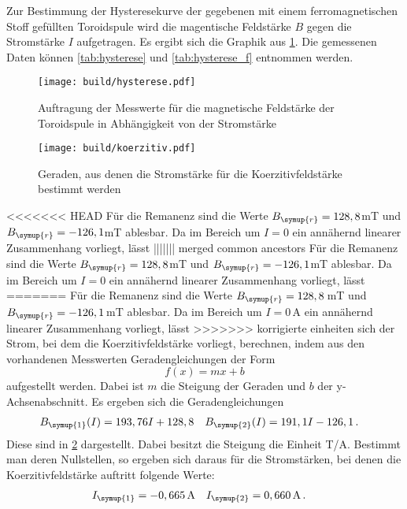 Zur Bestimmung der Hysteresekurve der gegebenen mit einem ferromagnetischen Stoff
gefüllten Toroidspule wird die magentische Feldstärke $B$ gegen die Stromstärke
$I$ aufgetragen. Es ergibt sich die Graphik aus \ref{fig:hysterese}. Die gemessenen
Daten können \ref{tab:hysterese} und \ref{tab:hysterese_f}  entnommen werden.

\begin{figure}
  \centering
  \texttt{[image: build/hysterese.pdf]}
  \caption{Auftragung der Messwerte für die magnetische Feldstärke der Toroidspule
  in Abhängigkeit von der Stromstärke}
  \label{fig:hysterese}
\end{figure}

\begin{figure}
  \centering
  \texttt{[image: build/koerzitiv.pdf]}
  \caption{Geraden, aus denen die Stromstärke für die Koerzitivfeldstärke bestimmt werden}
  \label{fig:koerzitiv}
\end{figure}


<<<<<<< HEAD
Für die Remanenz sind die Werte $B_{\symup{r}} = 128,8$mT und $B_{\symup{r}}=-126,1$mT
ablesbar. Da im Bereich um $I=0$ ein annähernd linearer Zusammenhang vorliegt, lässt
||||||| merged common ancestors
Für die Remanenz sind die Werte $B_{\symup{r}}=128,8$mT und $B_{\symup{r}}=-126,1$mT
ablesbar. Da im Bereich um $I=0$ ein annähernd linearer Zusammenhang vorliegt, lässt
=======
Für die Remanenz sind die Werte $B_{\symup{r}}=128,8$\,mT und $B_{\symup{r}}=-126,1$\,mT
ablesbar. Da im Bereich um $I=0$\,A ein annähernd linearer Zusammenhang vorliegt, lässt
>>>>>>> korrigierte einheiten
sich der Strom, bei dem die Koerzitivfeldstärke vorliegt, berechnen, indem aus den vorhandenen
Messwerten Geradengleichungen der Form
\begin{equation}
  f(x)=mx+b
  \end{equation}
aufgestellt werden. Dabei ist $m$ die Steigung der Geraden und $b$ der y-Achsenabschnitt.
Es ergeben sich die Geradengleichungen
\begin{align}
  B_{\symup{1}}(I)&=193,76I+128,8 & B_{\symup{2}}(I)&=191,1I-126,1\,.
\end{align}
Diese sind in \ref{fig:koerzitiv} dargestellt. Dabei besitzt die Steigung die Einheit
T/A.
Bestimmt man deren Nullstellen, so ergeben sich daraus für die Stromstärken, bei
denen die Koerzitivfeldstärke auftritt folgende Werte:
\begin{align}
  I_{\symup{1}}&=-0,665\,\text{A} & I_{\symup{2}}&=0,660\,\text{A}\,.
\end{align}


